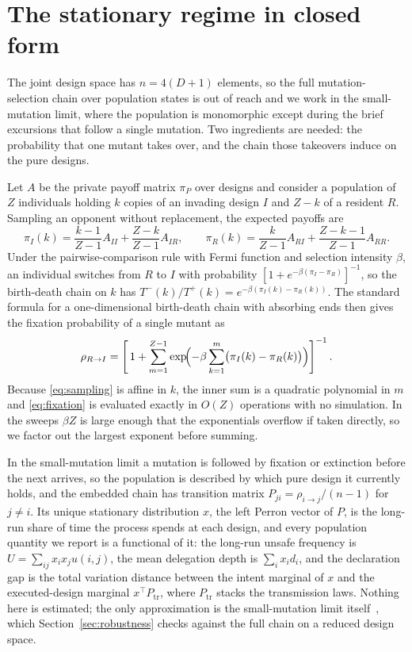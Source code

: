 \documentclass[11pt,a4paper]{article}
\theoremstyle{definition}
\begin{document}
\appendix

\section{The stationary regime in closed form}
\label{app:fixation}

The joint design space has $n=4(D+1)$ elements, so the full mutation-selection
chain over population states is out of reach and we work in the small-mutation
limit, where the population is monomorphic except during the brief excursions
that follow a single mutation. Two ingredients are needed: the probability that
one mutant takes over, and the chain those takeovers induce on the pure
designs.

Let $A$ be the private payoff matrix $\pi_{P}$ over designs and consider a
population of $Z$ individuals holding $k$ copies of an invading design $I$ and
$Z-k$ of a resident $R$. Sampling an opponent without replacement, the expected
payoffs are
\begin{equation}
  \pi_{I}(k) = \frac{k-1}{Z-1}A_{II} + \frac{Z-k}{Z-1}A_{IR},
  \qquad
  \pi_{R}(k) = \frac{k}{Z-1}A_{RI} + \frac{Z-k-1}{Z-1}A_{RR}.
  \label{eq:sampling}
\end{equation}
Under the pairwise-comparison rule with Fermi function and selection intensity
$\beta$, an individual switches from $R$ to $I$ with probability
$[1+e^{-\beta(\pi_{I}-\pi_{R})}]^{-1}$, so the birth-death chain on $k$ has
$T^{-}(k)/T^{+}(k)=e^{-\beta(\pi_{I}(k)-\pi_{R}(k))}$. The standard formula for
a one-dimensional birth-death chain with absorbing ends then gives the fixation
probability of a single mutant as
\begin{equation}
  \rho_{R\to I} = \left[\,1+\sum_{m=1}^{Z-1}
    \exp\!\Bigl(-\beta\sum_{k=1}^{m}\bigl(\pi_{I}(k)-\pi_{R}(k)\bigr)\Bigr)
  \right]^{-1}.
  \label{eq:fixation}
\end{equation}
Because \eqref{eq:sampling} is affine in $k$, the inner sum is a quadratic
polynomial in $m$ and \eqref{eq:fixation} is evaluated exactly in $O(Z)$
operations with no simulation. In the sweeps $\beta Z$ is large enough that the
exponentials overflow if taken directly, so we factor out the largest exponent
before summing.

In the small-mutation limit a mutation is followed by fixation or extinction
before the next arrives, so the population is described by which pure design it
currently holds, and the embedded chain has transition matrix
$P_{ji}=\rho_{i\to j}/(n-1)$ for $j\ne i$. Its unique stationary distribution
$x$, the left Perron vector of $P$, is the long-run share of time the process
spends at each design, and every population quantity we report is a functional
of it: the long-run unsafe frequency is $U=\sum_{ij}x_{i}x_{j}u(i,j)$, the mean
delegation depth is $\sum_{i}x_{i}d_{i}$, and the declaration gap is the total
variation distance between the intent marginal of $x$ and the executed-design
marginal $x^{\top}P_{\mathrm{tr}}$, where $P_{\mathrm{tr}}$ stacks the
transmission laws. Nothing here is estimated; the only approximation is the
small-mutation limit itself~\citep{wu2012howsmall}, which
Section~\ref{sec:robustness} checks against
the full chain on a reduced design space.
\end{document}
